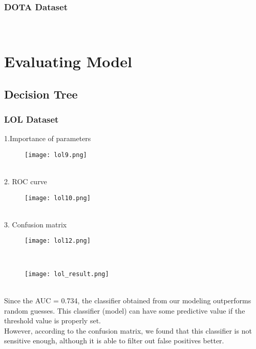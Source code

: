 \documentclass[a4paper,fleqn]{cas-sc}
\begin{document}
\subsubsection{DOTA Dataset}
 \\

\section{Evaluating Model}

\subsection{Decision Tree}
 
 
\subsubsection{LOL Dataset}
 1.Importance of parameters\\
 \begin{figure}[h!]
	\centering
		\texttt{[image: lol9.png]}
	\caption{}
	\label{FIG:1}
\end{figure}\\
2. ROC curve\\
\begin{figure}[h!]
	\centering
		\texttt{[image: lol10.png]}
	\caption{}
	\label{FIG:1}
\end{figure}\\
3. Confusion matrix\\
\begin{figure}[h!]
	\centering
		\texttt{[image: lol12.png]}
	\caption{}
	\label{FIG:1}
\end{figure}\\
\begin{figure}[h!]
	\centering
		\texttt{[image: lol\_result.png]}
	\caption{}
	\label{FIG:1}
\end{figure}\\
Since the AUC = 0.734, the classifier obtained from our modeling outperforms random guesses. This classifier (model) can have some predictive value if the threshold value is properly set.\\
However, according to the confusion matrix, we found that this classifier is not sensitive enough, although it is able to filter out false positives better.\\
\end{document}
